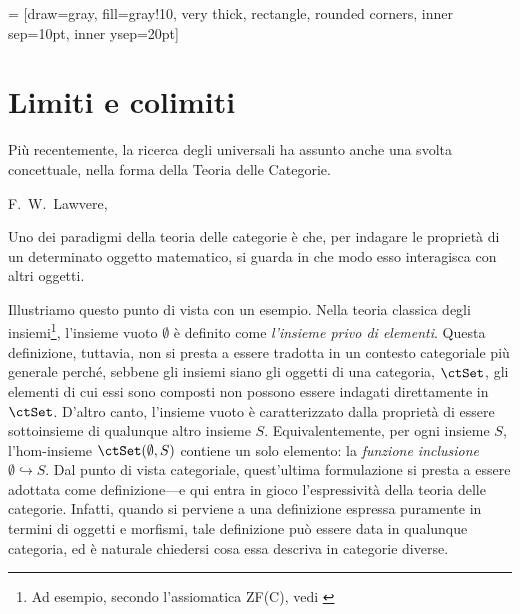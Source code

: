  = [draw=gray, fill=gray!10, very thick,
rectangle, rounded corners, inner sep=10pt, inner ysep=20pt]
\chapter{Limiti e colimiti}\label{chap_limiti_colimiti}
\epigraph{Più recentemente, la ricerca degli universali ha assunto anche una svolta concettuale, nella forma della Teoria delle Categorie.}{F.\ W.\ Lawvere, \cite{lawvere1969adjointness}}





Uno dei paradigmi della teoria delle categorie è che, per indagare le proprietà di un determinato oggetto matematico, si guarda in che modo esso interagisca con  altri oggetti.


Illustriamo questo punto di vista con un esempio. Nella teoria classica degli insiemi\footnote{Ad esempio, secondo l'assiomatica ZF(C), vedi \cite{ZFC}}, l'insieme vuoto \(\emptyset\) è definito come \emph{l'insieme privo di elementi}. Questa definizione, tuttavia, non si presta a essere tradotta in un contesto categoriale più generale perché, sebbene gli insiemi siano gli oggetti di una categoria, \(\ctSet\), gli elementi di cui essi sono composti non possono essere indagati direttamente in \(\ctSet\). D'altro canto, l'insieme vuoto è caratterizzato dalla  proprietà di essere sottoinsieme di qualunque altro insieme \(S\). Equivalentemente, per ogni insieme \(S\), l'hom-insieme \(\Hom\ctSet(\emptyset,S)\) contiene un solo elemento: la  \emph{funzione inclusione}  \(\emptyset \hookrightarrow S\). Dal punto di vista categoriale, quest'ultima formulazione si presta a essere adottata come definizione---e qui entra in gioco l'espressività della teoria delle categorie. Infatti, quando si perviene a una definizione espressa puramente in termini di oggetti e morfismi,  tale definizione può essere data in qualunque categoria, ed è naturale chiedersi cosa essa descriva in categorie diverse. 

